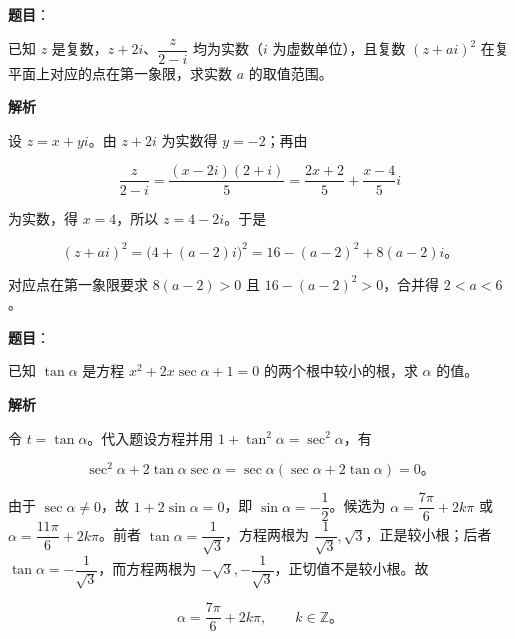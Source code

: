 \begin{answer}

\textbf{题目}：

已知 $z$ 是复数，$z+2i$、$\dfrac{z}{2-i}$ 均为实数（$i$ 为虚数单位），且复数 $(z+ai)^2$ 在复平面上对应的点在第一象限，求实数 $a$ 的取值范围。

\textbf{解析}

设 $z=x+yi$。由 $z+2i$ 为实数得 $y=-2$；再由

\nopagebreak[4]
\[
\frac{z}{2-i}=\frac{(x-2i)(2+i)}5
=\frac{2x+2}{5}+\frac{x-4}{5}i
\]

为实数，得 $x=4$，所以 $z=4-2i$。于是

\nopagebreak[4]
\[
(z+ai)^2=\bigl(4+(a-2)i\bigr)^2
=16-(a-2)^2+8(a-2)i\mbox{。}
\]

对应点在第一象限要求 $8(a-2)>0$ 且 $16-(a-2)^2>0$，合并得 $2<a<6$。


\end{answer}
\begin{answer}

\textbf{题目}：

已知 $\tan\alpha$ 是方程 $x^2+2x\sec\alpha+1=0$ 的两个根中较小的根，求 $\alpha$ 的值。

\textbf{解析}

令 $t=\tan\alpha$。代入题设方程并用 $1+\tan^2\alpha=\sec^2\alpha$，有

\nopagebreak[4]
\[
\sec^2\alpha+2\tan\alpha\sec\alpha
=\sec\alpha(\sec\alpha+2\tan\alpha)=0\mbox{。}
\]

由于 $\sec\alpha\ne0$，故 $1+2\sin\alpha=0$，即 $\sin\alpha=-\dfrac12$。候选为 $\alpha=\dfrac{7\pi}{6}+2k\pi$ 或 $\alpha=\dfrac{11\pi}{6}+2k\pi$。前者 $\tan\alpha=\dfrac1{\sqrt3}$，方程两根为 $\dfrac1{\sqrt3},\sqrt3$，正是较小根；后者 $\tan\alpha=-\dfrac1{\sqrt3}$，而方程两根为 $-\sqrt3,-\dfrac1{\sqrt3}$，正切值不是较小根。故

\nopagebreak[4]
\[
\alpha=\frac{7\pi}{6}+2k\pi,\qquad k\in\mathbb Z\mbox{。}
\]


\end{answer}
